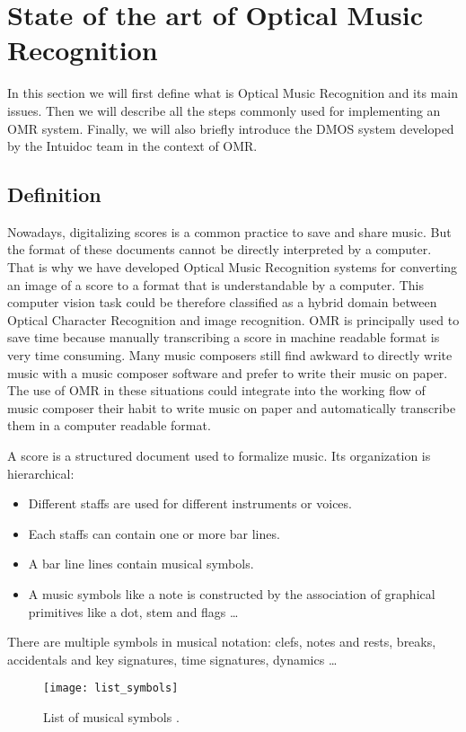 \documentclass[11pt]{sdm}
\begin{document}
\section{State of the art of Optical Music Recognition}

In this section we will first define what is Optical Music Recognition and its main issues.
Then we will describe all the steps commonly used for implementing an OMR system.
Finally, we will also briefly introduce the DMOS system developed by the Intuidoc team in the context of OMR.

\subsection{Definition}

Nowadays, digitalizing scores is a common practice to save and share music.
But the format of these documents cannot be directly interpreted by a computer.
That is why we have developed Optical Music Recognition systems for converting an image of a score to a format that is understandable by a computer.
This computer vision task could be therefore classified as a hybrid domain between Optical Character Recognition and image recognition.
OMR is principally used to save time because manually transcribing a score in machine readable format is very time consuming.
Many music composers still find awkward to directly write music with a music composer software and prefer to write their music on paper.
The use of OMR in these situations could integrate into the working flow of music composer their habit to write music on paper and automatically transcribe them in a computer readable format.

A score is a structured document used to formalize music.
Its organization is hierarchical:
\begin{itemize}
  \item Different staffs are used for different instruments or voices.
  \item Each staffs can contain one or more bar lines.
  \item A bar line lines contain musical symbols.
  \item A music symbols like a note is constructed by the association of graphical primitives like a dot, stem and flags \ldots
\end{itemize}
There are multiple symbols in musical notation: clefs, notes and rests, breaks, accidentals and key signatures, time signatures, dynamics \ldots
\begin{figure}[btp]
  \texttt{[image: list\_symbols]}
  \caption{\label{list_symbols} List of musical symbols \cite{fornes_analysis_2014}. }
\end{figure}
\end{document}
